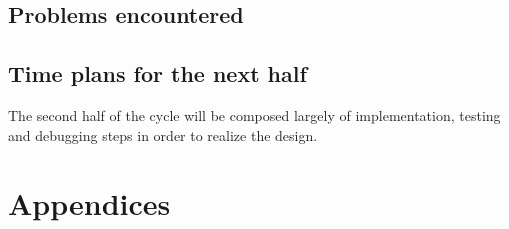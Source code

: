 \documentclass[paper=a4, fontsize=11pt,twoside]{scrartcl}		%
\begin{document}
\subsection{Problems encountered}
\subsection{Time plans for the next half}
The second half of the cycle will be composed largely of implementation, testing and debugging steps in order to realize the design.

\clearpage

\section{Appendices}
\clearpage




\end{document}
